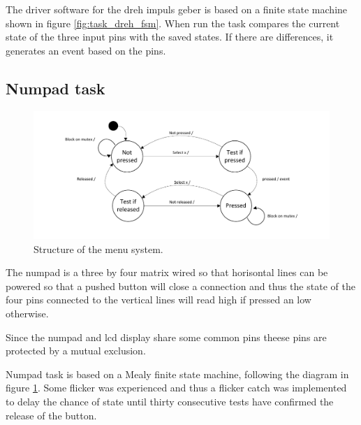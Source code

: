 The driver software for the dreh impuls geber is based on a finite state machine shown in figure \ref{fig:task_dreh_fsm}. When run the task compares the current state of the three input pins with the saved states. If there are differences, it generates an event based on the pins.

\subsection{Numpad task}
\begin{figure}[htb]
	\centering
	\includegraphics[width=\textwidth,trim=0 0 0 0]{graphics/numpad_task_fsm.pdf} 
	\caption{Structure of the menu system.}
	\label{fig:task_numpad_fsm}
\end{figure}
The numpad is a three by four matrix wired so that horisontal lines can be powered so that a pushed button will close a connection and thus the state of the four pins connected to the vertical lines will read high if pressed an low otherwise.

Since the numpad and lcd display share some common pins theese pins are protected by a mutual exclusion.

Numpad task is based on a Mealy finite state machine, following the diagram in figure \ref{fig:task_numpad_fsm}.  Some flicker was experienced and thus a flicker catch was implemented to delay the chance of state until thirty consecutive tests have confirmed the release of the button.

